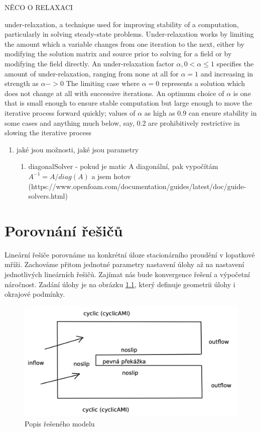 \documentclass[a4paper,12pt]{report}
\theoremstyle{remark}
\begin{document}
NĚCO O RELAXACI

under-relaxation, a technique used for improving stability of a computation, particularly in solving steady-state problems. Under-relaxation works by limiting the amount which a variable changes from one iteration to the next, either by modifying the solution matrix and source prior to solving for a field or by modifying the field directly. An under-relaxation factor $\alpha, 0 < \alpha \leq 1$  specifies the amount of under-relaxation, ranging from none at all for $\alpha = 1$  and increasing in strength as $\alpha -> 0$ The limiting case where $\alpha =  0$  represents a solution which does not change at all with successive iterations. An optimum choice of $\alpha$  is one that is small enough to ensure stable computation but large enough to move the iterative process forward quickly; values of $\alpha$   as high as 0.9 can ensure stability in some cases and anything much below, say, 0.2 are prohibitively restrictive in slowing the iterative process


\begin{enumerate}
	\item jaké jsou možnosti, jaké jsou parametry
	\begin{enumerate}
		\item     diagonalSolver - pokud je matic A diagonální, pak vypočítám $A^{-1} = A/diag(A)$ a jsem hotov (https://www.openfoam.com/documentation/guides/latest/doc/guide-solvers.html)
	\end{enumerate}
\end{enumerate}





	{\let\clearpage\relax \chapter{Porovnání řešičů}}
	
	Lineární řešiče porovnáme na konkrétní úloze stacionárního proudění v lopatkové mříži. Zachováme přitom jednotné parametry nastavení úlohy až na nastavení jednotlivých lineárních řešičů. Zajímat nás bude konvergence řešení a výpočetní náročnost. Zadání úlohy je na obrázku \ref{fig:zadani}, který definuje geometrii úlohy i okrajové podmínky. 
	
	\begin{figure}[H]
		\centering
		\includegraphics[width=1\linewidth]{zadani.png}
		\caption{Popis řešeného modelu}
		\label{fig:zadani}
	\end{figure}
\end{document}
